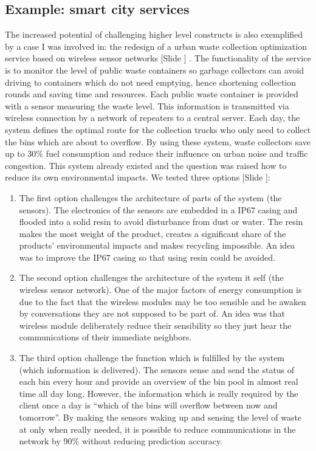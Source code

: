 \documentclass{article}
\newcounter{slide}
\begin{document}
\subsection{Example: smart city services}
\label{sec:smartcity}
The increased potential of challenging higher level constructs is also exemplified by a case I was involved in: the redesign of a urban waste collection optimization service based on wireless sensor networks {\color{blue}[Slide ]} \cite{bonvoisinAnalyseEnvironnementaleEcoconception2012}. The functionality of the service is to monitor the level of public waste containers so garbage collectors can avoid driving to containers which do not need emptying, hence shortening collection rounds and saving time and resources. Each public waste container is provided with a sensor measuring the waste level. This information is transmitted via wireless connection by a network of repeaters to a central server. Each day, the system defines the optimal route for the collection trucks who only need to collect the bins which are about to overflow. By using these system, waste collectors save up to 30\% fuel consumption and reduce their influence on urban noise and traffic congestion. This system already existed and the question was raised how to reduce its own environmental impacts. We tested three options {\color{blue}[Slide ]}:
\begin{enumerate}
	\item The first option challenges the architecture of parts of the system (the sensors). The electronics of the sensors are embedded in a IP67 casing and flooded into a solid resin to avoid disturbance from dust or water. The resin makes the most weight of the product, creates a significant share of the products' environmental impacts and makes recycling impossible. An idea was to improve the IP67 casing so that using resin could be avoided.
	\item The second option challenges the architecture of the system it self (the wireless sensor network). One of the major factors of energy consumption is due to the fact that the wireless modules may be too sensible and be awaken by conversations they are not supposed to be part of. An idea was that wireless module deliberately reduce their sensibility so they just hear the communications of their immediate neighbors. 
	\item The third option challenge the function which is fulfilled by the system (which information is delivered). The sensors sense and send the status of each bin every hour and provide an overview of the bin pool in almost real time all day long. However, the information which is really required by the client once a day is ``which of the bins will overflow between now and tomorrow''. By making the sensors waking up and sensing the level of waste at only when really needed, it is possible to reduce communications in the network by 90\% without reducing prediction accuracy.
\end{enumerate}
\end{document}
